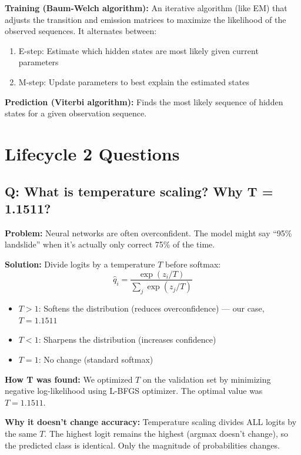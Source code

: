 \documentclass[11pt]{article}
\begin{document}
\textbf{Training (Baum-Welch algorithm):} An iterative algorithm (like EM) that adjusts the transition and emission matrices to maximize the likelihood of the observed sequences. It alternates between:
\begin{enumerate}[noitemsep]
    \item E-step: Estimate which hidden states are most likely given current parameters
    \item M-step: Update parameters to best explain the estimated states
\end{enumerate}

\textbf{Prediction (Viterbi algorithm):} Finds the most likely sequence of hidden states for a given observation sequence.

\section{Lifecycle 2 Questions}

\subsection{Q: What is temperature scaling? Why T = 1.1511?}

\textbf{Problem:} Neural networks are often overconfident. The model might say ``95\% landslide'' when it's actually only correct 75\% of the time.

\textbf{Solution:} Divide logits by a temperature $T$ before softmax:
\[
\hat{q}_i = \frac{\exp(z_i / T)}{\sum_j \exp(z_j / T)}
\]

\begin{itemize}[noitemsep]
    \item $T > 1$: Softens the distribution (reduces overconfidence) --- our case, $T = 1.1511$
    \item $T < 1$: Sharpens the distribution (increases confidence)
    \item $T = 1$: No change (standard softmax)
\end{itemize}

\textbf{How T was found:} We optimized $T$ on the validation set by minimizing negative log-likelihood using L-BFGS optimizer. The optimal value was $T = 1.1511$.

\textbf{Why it doesn't change accuracy:} Temperature scaling divides ALL logits by the same $T$. The highest logit remains the highest (argmax doesn't change), so the predicted class is identical. Only the magnitude of probabilities changes.
\end{document}
